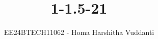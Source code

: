 \documentclass[journal]{IEEEtran}
\begin{document}

\vspace{3cm}

\title{1-1.5-21}
\author{EE24BTECH11062 - Homa Harshitha Vuddanti
}
{\let\newpage\relax\maketitle}

\renewcommand{\thefigure}{\theenumi}
\renewcommand{\thetable}{\theenumi}
\setlength{\intextsep}{10pt} %


\renewcommand{\thetable}{\theenumi}
\end{document}
